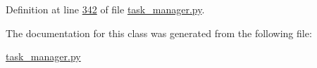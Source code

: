 Definition at line \hyperlink{task__manager_8py_source_l00342}{342} of file \hyperlink{task__manager_8py_source}{task\+\_\+manager.\+py}.



The documentation for this class was generated from the following file\+:\begin{DoxyCompactItemize}
\item 
\hyperlink{task__manager_8py}{task\+\_\+manager.\+py}\end{DoxyCompactItemize}
